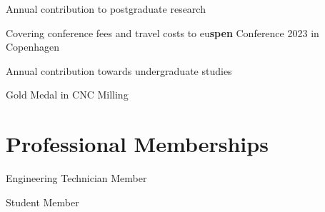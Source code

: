 \documentclass{cv}
\begin{document}
Annual contribution to postgraduate research

Covering conference fees and travel costs to eu\textbf{spen} Conference 2023 in Copenhagen 


Annual contribution towards undergraduate studies

 Gold Medal in CNC Milling 

\section{Professional Memberships}

Engineering Technician Member 

Student Member 
\end{document}
